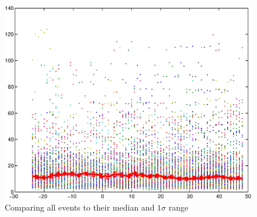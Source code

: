 \documentclass[10pt,twocolumn]{article}
\begin{document}
\begin{figure}[tp]
\centering
\includegraphics[scale=0.9]{paperfigures/allstorms.eps}
\caption{Comparing all events to their median and $1\sigma$ range}
\label{allstorms}
\end{figure}
\clearpage
\end{document}
